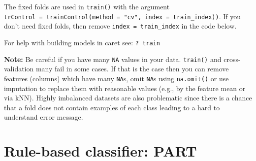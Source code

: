 \documentclass[
  notitlepage]{book}
\newenvironment{Shaded}{\begin{snugshade}}{\end{snugshade}}
\newcommand{\DataTypeTok}[1]{\textcolor[rgb]{0.13,0.29,0.53}{#1}}
\newcommand{\DecValTok}[1]{\textcolor[rgb]{0.00,0.00,0.81}{#1}}
\newcommand{\KeywordTok}[1]{\textcolor[rgb]{0.13,0.29,0.53}{\textbf{#1}}}
\newcommand{\NormalTok}[1]{#1}
\newcommand{\OperatorTok}[1]{\textcolor[rgb]{0.81,0.36,0.00}{\textbf{#1}}}
\newcommand{\OtherTok}[1]{\textcolor[rgb]{0.56,0.35,0.01}{#1}}
\newcommand{\StringTok}[1]{\textcolor[rgb]{0.31,0.60,0.02}{#1}}
\begin{document}
\begin{Shaded}
\end{Shaded}

The fixed folds are used in \texttt{train()} with the argument
\texttt{trControl\ =\ trainControl(method\ =\ "cv",\ index\ =\ train\_index))}. If
you don't need fixed folds, then remove \texttt{index\ =\ train\_index} in the
code below.

For help with building models in caret see: \texttt{?\ train}

\textbf{Note:} Be careful if you have many \texttt{NA} values in your data.
\texttt{train()} and cross-validation many fail in some cases. If that is the
case then you can remove features (columns) which have many \texttt{NA}s, omit
\texttt{NA}s using \texttt{na.omit()} or use imputation to replace them with
reasonable values (e.g., by the feature mean or via kNN). Highly
imbalanced datasets are also problematic since there is a chance that a
fold does not contain examples of each class leading to a hard to
understand error message.

\hypertarget{rule-based-classifier-part}{%
\section{Rule-based classifier: PART}\label{rule-based-classifier-part}}
\end{document}
